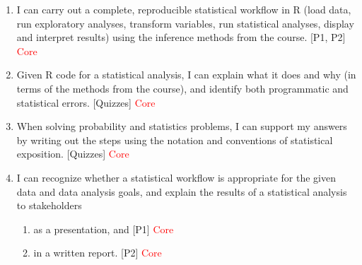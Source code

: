 \documentclass[12pt]{article}
\begin{document}
\begin{enumerate}
    \item I can carry out a complete, reproducible statistical workflow in R (load data, run exploratory analyses, transform variables, run statistical analyses, display and interpret results) using the inference methods from the course. [P1, P2] \textcolor{red}{Core} 
    \item Given R code for a statistical analysis, I can explain what it does and why (in terms of the methods from the course), and identify both programmatic and statistical errors. [Quizzes] \textcolor{red}{Core} 
    \item When solving probability and statistics problems, I can support my answers by writing out the steps using the notation and conventions of statistical exposition. [Quizzes] \textcolor{red}{Core} 
    \item I can recognize whether a statistical workflow is appropriate for the given data and data analysis goals, and explain the results of a statistical analysis to stakeholders
    \begin{enumerate}
        \item as a presentation, and [P1] \textcolor{red}{Core} 
        \item in a written report. [P2] \textcolor{red}{Core}
    \end{enumerate}    
\end{enumerate}

\end{document}
